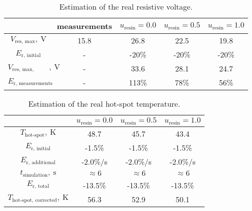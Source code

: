 \begin{table}[H]
    \caption{Estimation of the real resistive voltage.} 
    \vspace{-1.em} 
    \fontsize{10}{10}
    \selectfont 
    \renewcommand{\arraystretch}{1.5}
    \begin{center}
        \begin{tabular}{ | c | c | c | c | c | }  
        \hline
         & measurements & $u_\text{resin}=0.0$ & $u_\text{resin}=0.5$ & $u_\text{resin}=1.0$ \\
        \hline
        $V_\text{res, max},~\text{V}$ & 15.8 & 26.8 & 22.5 & 19.8 \\
        $E_\text{r, initial}$ & - & -20\% & -20\% & -20\% \\
        $V_\text{res, max, corrected},~\text{V}$ & - & 33.6 & 28.1 & 24.7 \\
        \hline 
        $E_\text{r, measurements}$ & - & 113\% & 78\% & 56\% \\
        \hline 
        \end{tabular}
    \end{center}  
     \label{table: skew_quad_general_remarks_res_voltage} 
\end{table}

\begin{table}[H]
    \caption{Estimation of the real hot-spot temperature.} 
    \vspace{-1.em} 
    \fontsize{10}{10}
    \selectfont 
    \renewcommand{\arraystretch}{1.5}
    \begin{center}
        \begin{tabular}{ | c | c | c | c | }  
        \hline
         & $u_\text{resin}=0.0$ & $u_\text{resin}=0.5$ & $u_\text{resin}=1.0$ \\
        \hline
        $T_\text{hot-spot},~\text{K}$ & 48.7 & 45.7 & 43.4 \\
        $E_\text{r, initial}$ & -1.5\% & -1.5\% & -1.5\% \\
        $E_\text{r, additional}$ & -2.0\%/s & -2.0\%/s & -2.0\%/s \\
        $t_\text{simulation},~\text{s}$ & $\approx 6$ & $\approx 6$ & $\approx 6$ \\
        $E_\text{r, total}$ & -13.5\% & -13.5\% & -13.5\% \\
        $T_\text{hot-spot, corrected},~\text{K}$ & 56.3 & 52.9 & 50.1 \\
        \hline 
        \end{tabular}
    \end{center}  
     \label{table: skew_quad_general_remarks_hot_spot} 
\end{table}

